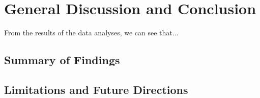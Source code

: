 \documentclass[12pt, titlepage]{article}
\begin{document}
\section{General Discussion and Conclusion}

From the results of the data analyses, we can see that...

\subsection{Summary of Findings}


\subsection{Limitations and Future Directions}

\clearpage


\let\svaddcontentsline\addcontentsline
\renewcommand\addcontentsline[3]{%
	\ifthenelse{\equal{#1}{lof}}{}%
	{\ifthenelse{\equal{#1}{lot}}{}{\svaddcontentsline{#1}{#2}{#3}}}}


\appendixtitleon
\appendixtitletocon
\end{document}
